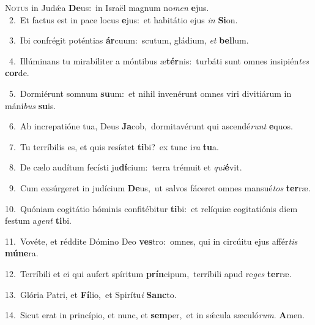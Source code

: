 \lettrine{\initial\textcolor{\initialcolor}{N}}{otus} in Judǽa \textbf{De}\-us:~\star in Israël magnum no\textit{men} \textbf{e}\-jus.\\
{\numbfont\textcolor{\numbcolor}{~2.}}~Et factus est in pace locus \textbf{e}\-jus:~\star et habitátio ejus \textit{in} \textbf{Si}\-on.\par
{\numbfont\textcolor{\numbcolor}{~3.}}~Ibi confrégit poténtias \textbf{ár}\-cuum:~\star scutum, gládium, \textit{et} \textbf{bel}\-lum.\par
{\numbfont\textcolor{\numbcolor}{~4.}}~Illúminans tu mirabíliter a móntibus æ\-\textbf{tér}\-nis:~\star turbáti sunt omnes insipién\textit{tes} \textbf{cor}\-de.\par
{\numbfont\textcolor{\numbcolor}{~5.}}~Dormiérunt somnum \textbf{su}\-um:~\star et nihil invenérunt omnes viri divitiárum in máni\textit{bus} \textbf{su}\-is.\par
{\numbfont\textcolor{\numbcolor}{~6.}}~Ab increpatióne tua, Deus \textbf{Ja}\-cob,~\star dormitavérunt qui ascendé\textit{runt} \textbf{e}\-quos.\par
{\numbfont\textcolor{\numbcolor}{~7.}}~Tu terríbilis es, et quis resístet \textbf{ti}\-bi?~\star ex tunc i\textit{ra} \textbf{tu}\-a.\par
{\numbfont\textcolor{\numbcolor}{~8.}}~De cælo audítum fecísti ju\-\textbf{dí}\-cium:~\star terra trémuit et \textit{qui}\-\textbf{é}vit.\par
{\numbfont\textcolor{\numbcolor}{~9.}}~Cum exsúrgeret in judícium \textbf{De}\-us,~\star ut salvos fáceret omnes mansué\textit{tos} \textbf{ter}\-ræ.\par
{\numbfont\textcolor{\numbcolor}{10.}}~Quóniam cogitátio hóminis confitébitur \textbf{ti}\-bi:~\star et relíquiæ cogitatiónis diem festum a\textit{gent} \textbf{ti}\-bi.\par
{\numbfont\textcolor{\numbcolor}{11.}}~Vovéte, et réddite Dómino Deo \textbf{ves}\-tro:~\star omnes, qui in circúitu ejus affér\textit{tis} \textbf{mú}\-\textbf{ne}ra.\par
{\numbfont\textcolor{\numbcolor}{12.}}~Terríbili et ei qui aufert spíritum \textbf{prín}\-cipum,~\star terríbili apud re\textit{ges} \textbf{ter}\-ræ.\par
{\numbfont\textcolor{\numbcolor}{13.}}~Glória Patri, et \textbf{Fí}\-lio,~\star et Spirítu\textit{i} \textbf{Sanc}\-to.\par
{\numbfont\textcolor{\numbcolor}{14.}}~Sicut erat in princípio, et nunc, et \textbf{sem}\-per,~\star et in sǽcula sæculó\-\textit{rum}\-. \textbf{A}\-men.\par
